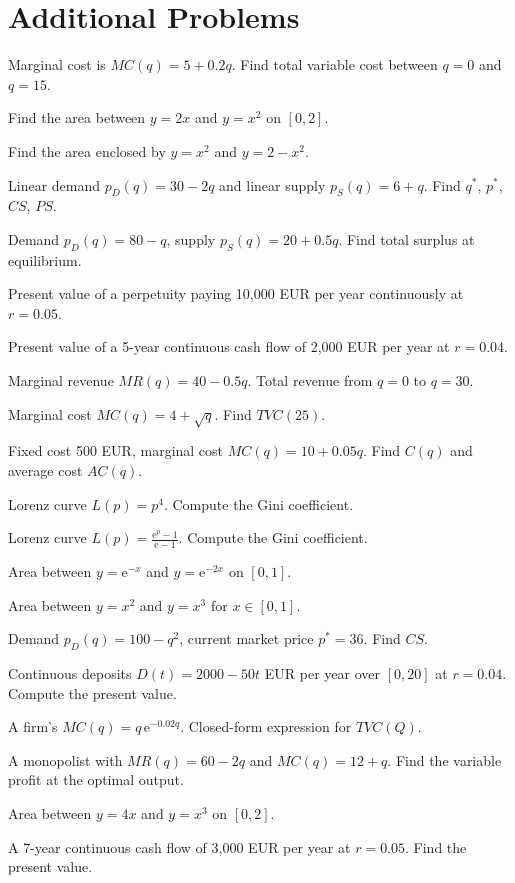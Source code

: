 \section{Additional Problems}

\begin{problems}
  \item Marginal cost is $MC(q)=5+0.2q$. Find total variable cost
        between $q=0$ and $q=15$.
  \item Find the area between $y=2x$ and $y=x^{2}$ on $[0,2]$.
  \item Find the area enclosed by $y=x^{2}$ and $y=2-x^{2}$.
  \item Linear demand $p_D(q)=30-2q$ and linear supply $p_S(q)=6+q$.
        Find $q^{*}$, $p^{*}$, $CS$, $PS$.
  \item Demand $p_D(q)=80-q$, supply $p_S(q)=20+0.5q$. Find total
        surplus at equilibrium.
  \item Present value of a perpetuity paying 10,000 EUR per year
        continuously at $r=0.05$.
  \item Present value of a 5-year continuous cash flow of 2,000 EUR per
        year at $r=0.04$.
  \item Marginal revenue $MR(q)=40-0.5q$. Total revenue from $q=0$ to
        $q=30$.
  \item Marginal cost $MC(q)=4+\sqrt{q}$. Find $TVC(25)$.
  \item Fixed cost 500 EUR, marginal cost $MC(q)=10+0.05q$. Find $C(q)$
        and average cost $AC(q)$.
  \item Lorenz curve $L(p)=p^{4}$. Compute the Gini coefficient.
  \item Lorenz curve $L(p)=\frac{\mathrm{e}^{p}-1}{\mathrm{e}-1}$.
        Compute the Gini coefficient.
  \item Area between $y=\mathrm{e}^{-x}$ and $y=\mathrm{e}^{-2x}$ on
        $[0,1]$.
  \item Area between $y=x^{2}$ and $y=x^{3}$ for $x\in[0,1]$.
  \item Demand $p_D(q)=100-q^{2}$, current market price $p^{*}=36$.
        Find $CS$.
  \item Continuous deposits $D(t)=2000-50t$ EUR per year over $[0,20]$
        at $r=0.04$. Compute the present value.
  \item A firm's $MC(q)=q\,\mathrm{e}^{-0.02q}$. Closed-form expression
        for $TVC(Q)$.
  \item A monopolist with $MR(q)=60-2q$ and $MC(q)=12+q$. Find the
        variable profit at the optimal output.
  \item Area between $y=4x$ and $y=x^{3}$ on $[0,2]$.
  \item A 7-year continuous cash flow of 3,000 EUR per year at
        $r=0.05$. Find the present value.
\end{problems}

